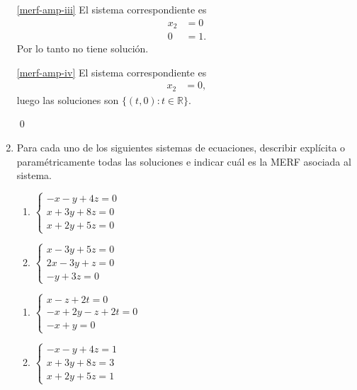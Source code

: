 \begin{enumerate}[topsep=6pt, itemsep=.4cm]
\ref{merf-amp-iii} El sistema  correspondiente  es 
$$\begin{array}{rl}
x_2 &= 0 \\ 0&=1.
\end{array}$$
Por lo tanto no tiene solución.


\ref{merf-amp-iv} El sistema correspondiente  es 
$$\begin{array}{rl}
x_2&=0,
\end{array}$$
luego  las soluciones son $\{ (t,0): t\in \mathbb R \}$.


\qed

\item\label{sistemas homogeneos} Para cada uno de los siguientes sistemas de ecuaciones, describir explícita o paramétricamente todas las soluciones e indicar cuál es la MERF asociada al sistema.
\begin{multicols}{2}
\begin{enumerate}
\item\label{sistemas-homogeneos-merf-a} $\begin{cases}
 -x - y + 4z = 0\\
 x+3y+8z = 0\\
 x+2y + 5z = 0
\end{cases}$
\item\label{sistemas-homogeneos-merf-b} $\begin{cases}
 x - 3y + 5z = 0\\
 2x-3y+z = 0\\
 -y + 3z = 0
\end{cases}$
\end{enumerate}
\end{multicols}

\begin{multicols}{2}
    \begin{enumerate}
        \addtocounter{enumii}{2}
\item\label{sistemas-homogeneos-merf-c} $\begin{cases}
x-z+2t = 0\\
-x+2y-z+2t = 0\\
-x+y = 0
\end{cases}$
\item\label{sistemas-homogeneos-merf-d} $\begin{cases}
    -x - y + 4z = 1\\
    x+3y+8z = 3\\
    x+2y + 5z = 1
   \end{cases}$
\end{enumerate}
\end{multicols}


\end{enumerate}
